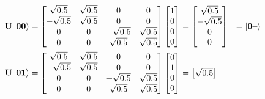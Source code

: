 \begin{figure}[H]
    \begin{alignat*}{2}
        \mathbf{U}\ket{\mathbf{0}\mathbf{0}}&=
        \begin{bmatrix}
            \sqrt{0.5}  &  \sqrt{0.5}   & 0             & 0          \\
            -\sqrt{0.5} &  \sqrt{0.5}   & 0             & 0          \\
            0           & 0             & -\sqrt{0.5}   & \sqrt{0.5} \\
            0           & 0             & \sqrt{0.5}    & \sqrt{0.5} \\
        \end{bmatrix}
        \begin{bmatrix}
            1 \\
            0 \\
            0 \\
            0 \\
        \end{bmatrix}
        =
        \begin{bmatrix}
            \sqrt{0.5}   \\
            -\sqrt{0.5}  \\
            0            \\
            0            \\
        \end{bmatrix}&=\ket{\mathbf{0}\textbf{--}}\\
        \mathbf{U}\ket{\mathbf{0}\mathbf{1}}&=
        \begin{bmatrix}
            \sqrt{0.5}  &  \sqrt{0.5}   & 0             & 0          \\
            -\sqrt{0.5} &  \sqrt{0.5}   & 0             & 0          \\
            0           & 0             & -\sqrt{0.5}   & \sqrt{0.5} \\
            0           & 0             & \sqrt{0.5}    & \sqrt{0.5} \\
        \end{bmatrix}
        \begin{bmatrix}
            0 \\
            1 \\
            0 \\
            0 \\
        \end{bmatrix}
        =
        \begin{bmatrix}
            \sqrt{0.5}   \\

\end{bmatrix}
\end{alignat*}
\end{figure}
